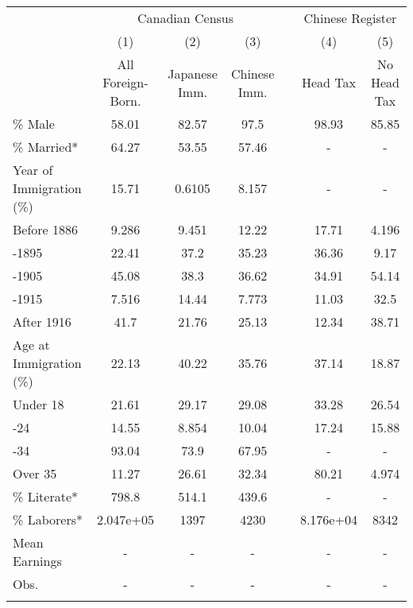 \begin{tabular}{lcccccc}
\hhline{=======}
& \multicolumn{3}{c}{Canadian Census} & & \multicolumn{2}{c}{Chinese Register} \\ 
\hhline{~---~--}
& (1) & (2) & (3) & & (4) & (5) \\ 
& All Foreign-Born. & Japanese Imm. & Chinese Imm. & & Head Tax & No Head Tax \\ 
 \hhline{-------}
\% Male & 58.01&82.57& 97.5&&98.93&85.85 \\ 
\% Married* & 64.27&53.55&57.46&&-&- \\ 
Year of Immigration (\%) & 15.71&0.6105&8.157&&-&- \\ 
\;\; Before 1886 & 9.286&9.451&12.22&&17.71&4.196 \\ 
\;\; 1886-1895 & 22.41& 37.2&35.23&&36.36& 9.17 \\ 
\;\; 1896-1905 & 45.08& 38.3&36.62&&34.91&54.14 \\ 
\;\; 1906-1915 & 7.516&14.44&7.773&&11.03& 32.5 \\ 
\;\;After 1916 &  41.7&21.76&25.13&&12.34&38.71 \\ 
Age at Immigration (\%) & 22.13&40.22&35.76&&37.14&18.87 \\ 
\;\; Under 18 & 21.61&29.17&29.08&&33.28&26.54 \\ 
\;\; 18-24 & 14.55&8.854&10.04&&17.24&15.88 \\ 
\;\; 25-34 & 93.04& 73.9&67.95&&-&- \\ 
\;\; Over 35 & 11.27&26.61&32.34&&80.21&4.974 \\ 
\% Literate* & 798.8&514.1&439.6&&-&- \\ 
\% Laborers* & 2.047e+05& 1397& 4230&&8.176e+04& 8342 \\ 
Mean Earnings & -&-&-&&-&- \\ 
Obs.
&
-&-&-&&-&-
\\ 
\hhline{-------}
\end{tabular}
